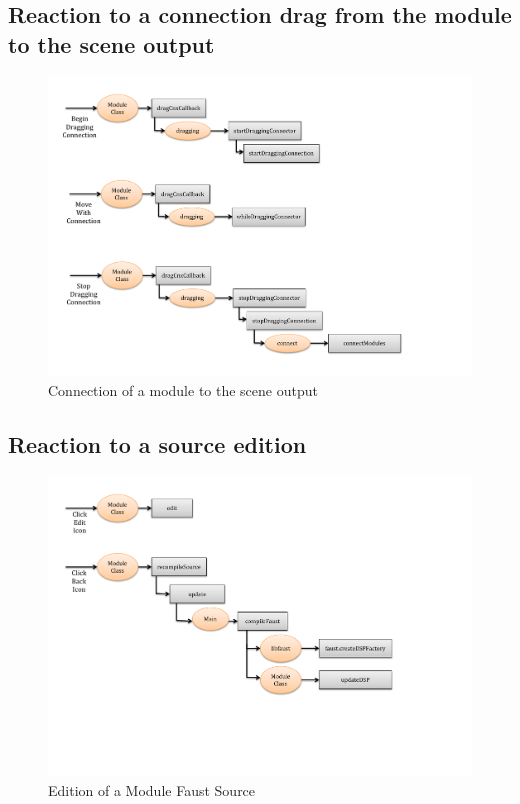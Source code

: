 \documentclass[a4paper]{article}
\begin{document}
\newpage
\subsection{Reaction to a connection drag from the module to the scene output}
\begin{figure}[!h]
\begin{center}
\includegraphics[width=\columnwidth]{images/ScenarioConnect.pdf}
\caption{Connection of a module to the scene output}
\label{fig:classes}
\end{center}
\end{figure}

\newpage
\subsection{Reaction to a source edition}
\begin{figure}[!h]
\begin{center}
\includegraphics[width=\columnwidth]{images/ScenarioEdit.pdf}
\caption{Edition of a Module Faust Source}
\label{fig:classes}
\end{center}
\end{figure}
\end{document}
